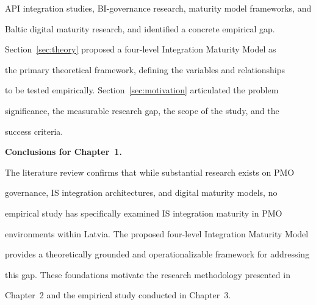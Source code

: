 API integration studies, BI-governance research, maturity model frameworks, and  

Baltic digital maturity research, and identified a concrete empirical gap.  

Section~\ref{sec:theory} proposed a four-level Integration Maturity Model as  

the primary theoretical framework, defining the variables and relationships  

to be tested empirically. Section~\ref{sec:motivation} articulated the problem 

significance, the measurable research gap, the scope of the study, and the  

success criteria. 

  

\noindent\textbf{Conclusions for Chapter~1.} 

The literature review confirms that while substantial research exists on PMO  

governance, IS integration architectures, and digital maturity models, no  

empirical study has specifically examined IS integration maturity in PMO  

environments within Latvia. The proposed four-level Integration Maturity Model  

provides a theoretically grounded and operationalizable framework for addressing  

this gap. These foundations motivate the research methodology presented in  

Chapter~2 and the empirical study conducted in Chapter~3.

